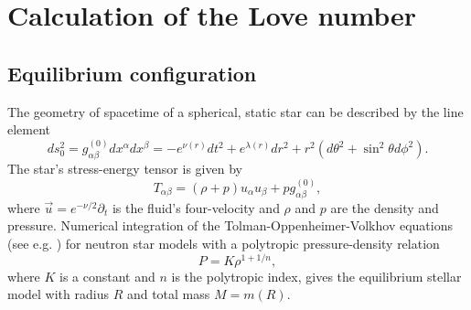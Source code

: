 \documentclass[12pt,preprint]{aastex}
\begin{document}
{\section{Calculation of the Love number}
\label{sec:lovecalc}
\subsection{Equilibrium configuration} \label{subsecequil} The
geometry of spacetime of a spherical, static star can be described
by the line element \citep{mtw}
\begin{equation}
ds_0^2=g^{(0)}_{\alpha \beta}dx^\alpha
dx^\beta=-e^{\nu(r)}dt^2+e^{\lambda(r)}dr^2+r^2
\left(d\theta^2+\sin^2\theta d \phi^2 \right).
\end{equation} The star's stress-energy
tensor is given by \begin{equation} T_{\alpha
\beta}=\left(\rho+p\right)u_\alpha u_\beta+pg^{(0)}_{\alpha
\beta},\label{tab}\end{equation} where
$\vec{u}=e^{-\nu/2}\partial_t$ is the fluid's four-velocity and
$\rho$ and $p$ are the density and pressure. Numerical integration
of the Tolman-Oppenheimer-Volkhov equations (see e.g. \citet{mtw})
for neutron star models with a polytropic pressure-density relation
\begin{equation} P=K\rho^{1+1/n},\end{equation} where $K$ is a constant and $n$ is the
polytropic index, gives the equilibrium stellar model with radius
$R$ and total mass $M=m(R)$.

}
\end{document}
